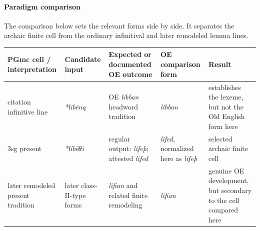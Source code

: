 \documentclass[
  british,
  a4paper,
]{article}
\newcounter{none} %
\begin{document}
\paragraph{Paradigm comparison}\label{paradigm-comparison-12}

The comparison below sets the relevant forms side by side. It separates
the archaic finite cell from the ordinary infinitival and later
remodeled lemma lines.

{\def\LTcaptype{none} %
\begin{longtable}[]{@{}
  >{\raggedright\arraybackslash}p{}
  >{\raggedright\arraybackslash}p{}
  >{\raggedright\arraybackslash}p{}
  >{\raggedright\arraybackslash}p{}
  >{\raggedright\arraybackslash}p{}@{}}
\toprule\noalign{}
\begin{minipage}[b]{\linewidth}\raggedright
PGmc cell / interpretation
\end{minipage} & \begin{minipage}[b]{\linewidth}\raggedright
Candidate input
\end{minipage} & \begin{minipage}[b]{\linewidth}\raggedright
Expected or documented OE outcome
\end{minipage} & \begin{minipage}[b]{\linewidth}\raggedright
OE comparison form
\end{minipage} & \begin{minipage}[b]{\linewidth}\raggedright
Result
\end{minipage} \\
\midrule\noalign{}
\endhead
\bottomrule\noalign{}
\endlastfoot
citation infinitive line & {\emph{*libēną}} & OE {\emph{libban}}
headword tradition & {\emph{libban}} & establishes the lexeme, but not
the Old English form here \\
3sg present & {\emph{*líbēθi}} & regular output: {\emph{lifeþ}};
attested {\emph{lifed}} & {\emph{lifed}}, normalized here as
{\emph{lifeþ}} & selected archaic finite cell \\
later remodeled present tradition & later class-II-type forms &
{\emph{lifian}} and related finite remodeling & {\emph{lifian}} &
genuine OE development, but secondary to the cell compared here \\
\end{longtable}
}
\end{document}
